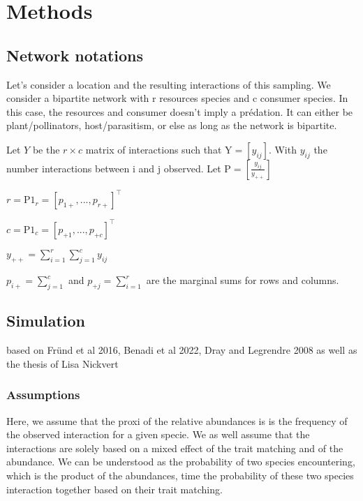 \documentclass{article}
\begin{document}
\section{Methods}

\subsection{Network notations}
Let's consider a location and the resulting interactions of this sampling. We consider a bipartite network with r resources species and c consumer species. In this case, the resources and consumer doesn't imply a prédation. It can either be plant/pollinators, host/parasitism, or else as long as the network is bipartite. 

Let $Y$ be the $r\times c$ matrix of interactions such that $\textrm{Y} = [y_{ij}]$. With $y_{ij}$ the number interactions between i and j observed.
Let $\textrm{P}=[\frac{y_{ij}}{y_{++}}]$

$r=\textrm{P1}_r =[p_{1+}, ..., p_{r+}]^\intercal$

$c=\textrm{P1}_c=[p_{+1}, ..., p_{+c}]^\intercal$

$y_{++}=\sum_{i=1}^{r}\sum_{j=1}^{c}y_{ij}$

$p_{i+}=\sum_{j=1}^{c}$ and $p_{+j}=\sum_{i=1}^{r}$ are the marginal sums for rows and columns.














\subsection{Simulation}

based on Fründ et al 2016, Benadi et al 2022, Dray and Legrendre 2008 as well as the thesis of Lisa Nickvert

\subsubsection{Assumptions}
Here, we assume that the proxi of the relative abundances is is the frequency of the observed interaction for a given specie. We as well assume that the interactions are solely based on a mixed effect of the trait matching and of the abundance. We can be understood as the probability of two species encountering, which is the product of the abundances, time the probability of these two species interaction together based on their trait matching.
\end{document}
